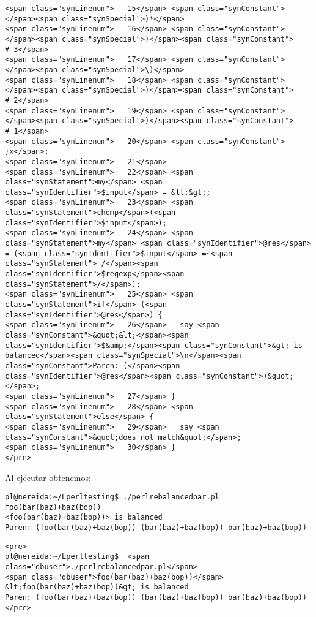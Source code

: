 \begin{verbatim}
<span class="synLinenum">   15</span> <span class="synConstant">                           </span><span class="synSpecial">)*</span>
<span class="synLinenum">   16</span> <span class="synConstant">                        </span><span class="synSpecial">)</span><span class="synConstant">               # 3</span>
<span class="synLinenum">   17</span> <span class="synConstant">                     </span><span class="synSpecial">\)</span>
<span class="synLinenum">   18</span> <span class="synConstant">                    </span><span class="synSpecial">)</span><span class="synConstant">                   # 2</span>
<span class="synLinenum">   19</span> <span class="synConstant">              </span><span class="synSpecial">)</span><span class="synConstant">                         # 1</span>
<span class="synLinenum">   20</span> <span class="synConstant">    }x</span>;
<span class="synLinenum">   21</span> 
<span class="synLinenum">   22</span> <span class="synStatement">my</span> <span class="synIdentifier">$input</span> = &lt;&gt;;
<span class="synLinenum">   23</span> <span class="synStatement">chomp</span>(<span class="synIdentifier">$input</span>);
<span class="synLinenum">   24</span> <span class="synStatement">my</span> <span class="synIdentifier">@res</span> = (<span class="synIdentifier">$input</span> =~<span class="synStatement"> /</span><span class="synIdentifier">$regexp</span><span class="synStatement">/</span>);
<span class="synLinenum">   25</span> <span class="synStatement">if</span> (<span class="synIdentifier">@res</span>) {
<span class="synLinenum">   26</span>   say <span class="synConstant">&quot;&lt;</span><span class="synIdentifier">$&amp;</span><span class="synConstant">&gt; is balanced</span><span class="synSpecial">\n</span><span class="synConstant">Paren: (</span><span class="synIdentifier">@res</span><span class="synConstant">)&quot;</span>;
<span class="synLinenum">   27</span> }
<span class="synLinenum">   28</span> <span class="synStatement">else</span> {
<span class="synLinenum">   29</span>   say <span class="synConstant">&quot;does not match&quot;</span>;
<span class="synLinenum">   30</span> }
</pre>

\end{verbatim}
Al ejecutar obtenemos:

\begin{latexonly}
\begin{verbatim}
pl@nereida:~/Lperltesting$ ./perlrebalancedpar.pl
foo(bar(baz)+baz(bop))
<foo(bar(baz)+baz(bop))> is balanced
Paren: (foo(bar(baz)+baz(bop)) (bar(baz)+baz(bop)) bar(baz)+baz(bop))
\end{verbatim}
\end{latexonly}
\begin{verbatim}
<pre>
pl@nereida:~/Lperltesting$  <span class="dbuser">./perlrebalancedpar.pl</span>
<span class="dbuser">foo(bar(baz)+baz(bop))</span>
&lt;foo(bar(baz)+baz(bop))&gt; is balanced
Paren: (foo(bar(baz)+baz(bop)) (bar(baz)+baz(bop)) bar(baz)+baz(bop))
</pre>
\end{verbatim}



